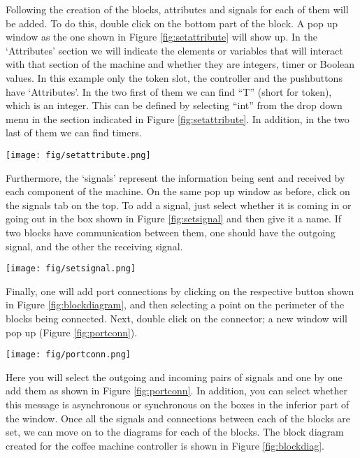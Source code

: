 \documentclass[12pt]{article}
\begin{document}
	Following the creation of the blocks, attributes and signals for each of them will be added. To do this, double click on the bottom part of the block. A pop up window as the one shown in Figure \ref{fig:setattribute} will show up. In the ‘Attributes’ section we will indicate the elements or variables that will interact with that section of the machine and whether they are integers, timer or Boolean values. In this example only the token slot, the controller and the pushbuttons have ‘Attributes’. In the two first of them we can find “T” (short for token), which is an integer. This can be defined by selecting “int” from the drop down menu in the section indicated in Figure \ref{fig:setattribute}. In addition, in the two last of them we can find timers.


\begin{figure*}[htbp]
\centering
\texttt{[image: fig/setattribute.png]}
\caption{Setting attributes of a block} \label{fig:setattribute}
\end{figure*}


Furthermore, the ‘signals’ represent the information being sent and received by each component of the machine. On the same pop up window as before, click on the signals tab on the top. To add a signal, just select whether it is coming in or going out in the box shown in Figure \ref{fig:setsignal} and then give it a name. If two blocks have communication between them, one should have the outgoing signal, and the other the receiving signal. 

\begin{figure*}[htbp]
\centering
\texttt{[image: fig/setsignal.png]}
\caption{Setting signals of a block} \label{fig:setsignal}
\end{figure*}


	Finally, one will add port connections by clicking on the respective button shown in Figure \ref{fig:blockdiagram}, and then selecting a point on the perimeter of the blocks being connected. Next, double click on the connector; a new window will pop up (Figure \ref{fig:portconn}). 
	
	\begin{figure*}[htbp]
\centering
\texttt{[image: fig/portconn.png]}
\caption{Port Connection between blocks} \label{fig:portconn}
\end{figure*}

	Here you will select the outgoing and incoming pairs of signals and one by one add them as shown in Figure \ref{fig:portconn}. In addition, you can select whether this message is asynchronous or synchronous on the boxes in the inferior part of the window. Once all the signals and connections between each of the blocks are set, we can move on to the diagrams for each of the blocks.
The block diagram created for the coffee machine controller is shown in Figure \ref{fig:blockdiag}.
\end{document}
